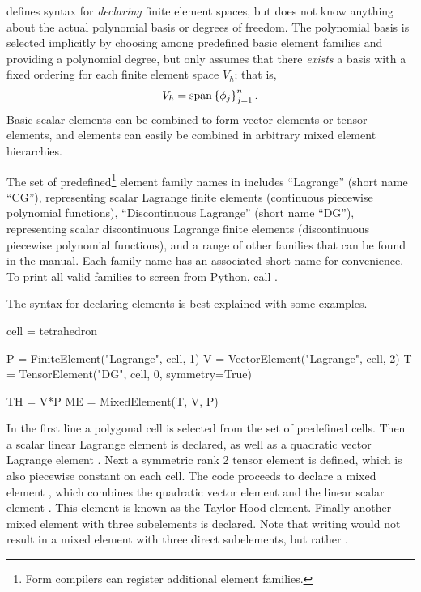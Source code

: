 \ufl{} defines syntax for \emph{declaring} finite element spaces, but
does not know anything about the actual polynomial basis or degrees of
freedom. The polynomial basis is selected implicitly by choosing among
predefined basic element families and providing a polynomial degree,
but \ufl{} only assumes that there \emph{exists} a basis with a fixed
ordering for each finite element space $V_h$; that is,
\begin{align}
V_h = \operatorname{span}\left\{ \phi_j \right\}_{j=1}^{n}.
\end{align}
Basic scalar elements can be combined to form vector elements or
tensor elements, and elements can easily be combined in arbitrary
mixed element hierarchies.

The set of predefined\footnote{Form compilers can register additional
  element families.}  element family names in \ufl{} includes
``Lagrange'' (short name ``CG''), representing scalar Lagrange finite
elements (continuous piecewise polynomial functions), ``Discontinuous
Lagrange'' (short name ``DG''), representing scalar discontinuous
Lagrange finite elements (discontinuous piecewise polynomial
functions), and a range of other families that can be found in the
manual.  Each family name has an associated short name for
convenience.  To print all valid families to screen from Python, call
.

The syntax for declaring elements is best explained with some
examples.
\begin{uflcode}
cell = tetrahedron

P = FiniteElement("Lagrange", cell, 1)
V = VectorElement("Lagrange", cell, 2)
T = TensorElement("DG", cell, 0, symmetry=True)

TH = V*P
ME = MixedElement(T, V, P)
\end{uflcode}
In the first line a polygonal cell is selected from the set of
predefined cells.  Then a scalar linear Lagrange element  is
declared, as well as a quadratic vector Lagrange element .
Next a symmetric rank 2 tensor element  is defined, which is
also piecewise constant on each cell. The code proceeds to declare a
mixed element , which combines the quadratic vector element
 and the linear scalar element . This element is known
as the Taylor-Hood element.  Finally another mixed element with three
subelements is declared. Note that writing  would not
result in a mixed element with three direct subelements, but rather
.


